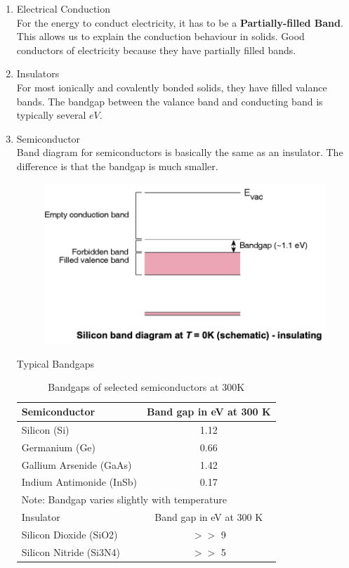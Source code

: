 \documentclass{article}
\begin{document}
\begin{enumerate}
    \item Electrical Conduction \\
    For the energy to conduct electricity, it has to be a \textbf{Partially-filled Band}. \\
    This allows us to explain the conduction behaviour in solids. Good conductors of electricity because they have partially filled bands.
    \item Insulators \\
    For most ionically and covalently bonded solids, they have filled valance bands. The bandgap between the valance band and conducting band is typically several $eV$.
    \item Semiconductor \\
    Band diagram for semiconductors is basically the same as an insulator. The difference is that the bandgap is much smaller.
    \begin{figure}[h]
        \centering
        \includegraphics[width=0.75\linewidth]{image/semibandgap.png}
    \end{figure}
    Typical Bandgaps 
    \begin{table}[h!]
      \centering
      \caption{Bandgaps of selected semiconductors at 300K}
      \begin{tabular}{lc}
        \toprule
        Semiconductor & Band gap in eV at 300 K \\
        \midrule
        Silicon (Si) & 1.12 \\
        Germanium (Ge) & 0.66 \\
        Gallium Arsenide (GaAs) & 1.42 \\
        Indium Antimonide (InSb) & 0.17 \\
    
        \midrule
        \multicolumn{2}{l}{Note: Bandgap varies slightly with temperature} \\
        \midrule
        Insulator & Band gap in eV at 300 K \\
        \midrule
        Silicon Dioxide (SiO2) &  $>>$ 9 \\
        Silicon Nitride (Si3N4) &  $>>$ 5 \\
    

\end{tabular}
\end{table}
\end{enumerate}
\end{document}
